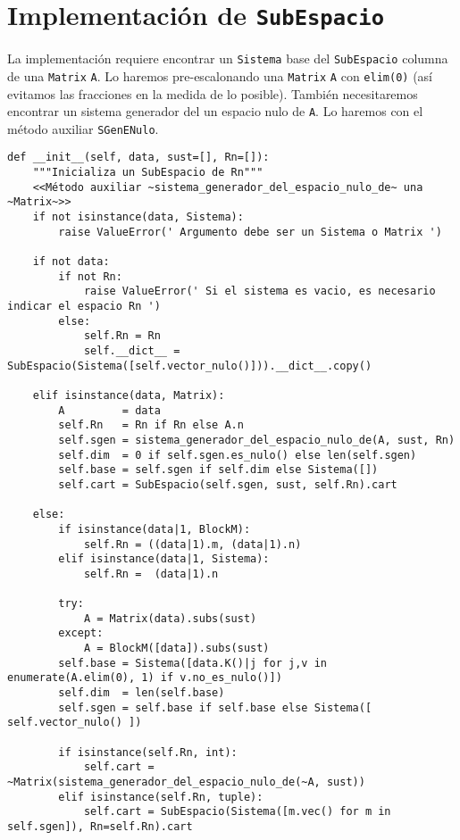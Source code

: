 \documentclass[11pt]{report}
\begin{document}
\section{Implementación de \texttt{SubEspacio}}
\label{sec:org60f13db}

La implementación requiere encontrar un \texttt{Sistema} base del
\texttt{SubEspacio} columna de una \texttt{Matrix} \texttt{A}. Lo haremos pre-escalonando
una \texttt{Matrix} \texttt{A} con \texttt{elim(0)} (así evitamos las fracciones en la medida
de lo posible). También necesitaremos encontrar un sistema generador
del un espacio nulo de \texttt{A}. Lo haremos con el método auxiliar
\texttt{SGenENulo}.

\begin{verbatim}
def __init__(self, data, sust=[], Rn=[]):
    """Inicializa un SubEspacio de Rn"""
    <<Método auxiliar ~sistema_generador_del_espacio_nulo_de~ una ~Matrix~>>
    if not isinstance(data, Sistema):
        raise ValueError(' Argumento debe ser un Sistema o Matrix ')
    
    if not data:
        if not Rn:
            raise ValueError(' Si el sistema es vacio, es necesario indicar el espacio Rn ')
        else:
            self.Rn = Rn
            self.__dict__ = SubEspacio(Sistema([self.vector_nulo()])).__dict__.copy()
        
    elif isinstance(data, Matrix):
        A         = data
        self.Rn   = Rn if Rn else A.n
        self.sgen = sistema_generador_del_espacio_nulo_de(A, sust, Rn)
        self.dim  = 0 if self.sgen.es_nulo() else len(self.sgen)
        self.base = self.sgen if self.dim else Sistema([])
        self.cart = SubEspacio(self.sgen, sust, self.Rn).cart

    else:
        if isinstance(data|1, BlockM):
            self.Rn = ((data|1).m, (data|1).n)
        elif isinstance(data|1, Sistema):
            self.Rn =  (data|1).n
            
        try:
            A = Matrix(data).subs(sust)
        except:
            A = BlockM([data]).subs(sust)
        self.base = Sistema([data.K()|j for j,v in enumerate(A.elim(0), 1) if v.no_es_nulo()])
        self.dim  = len(self.base)
        self.sgen = self.base if self.base else Sistema([ self.vector_nulo() ])
        
        if isinstance(self.Rn, int):
            self.cart = ~Matrix(sistema_generador_del_espacio_nulo_de(~A, sust))
        elif isinstance(self.Rn, tuple):
            self.cart = SubEspacio(Sistema([m.vec() for m in self.sgen]), Rn=self.Rn).cart
    
\end{verbatim}
\end{document}
